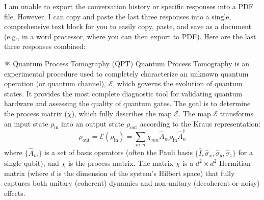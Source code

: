 I am unable to export the conversation history or specific responses into a PDF file.
However, I can copy and paste the last three responses into a single, comprehensive text block for you to easily copy, paste, and save as a document (e.g., in a word processor, where you can then export to PDF).
Here are the last three responses combined:

⚛️ Quantum Process Tomography (QPT)
Quantum Process Tomography is an experimental procedure used to completely characterize an unknown quantum operation (or quantum channel), $\mathcal{E}$, which governs the evolution of quantum states. It provides the most complete diagnostic tool for validating quantum hardware and assessing the quality of quantum gates.
The goal is to determine the process matrix ($\chi$), which fully describes the map $\mathcal{E}$. The map $\mathcal{E}$ transforms an input state $\rho_{\text{in}}$ into an output state $\rho_{\text{out}}$ according to the Kraus representation:
$$\rho_{\text{out}} = \mathcal{E}(\rho_{\text{in}}) = \sum_{m,n} \chi_{mn} \hat{A}_m \rho_{\text{in}} \hat{A}^\dagger_n$$
where $\{\hat{A}_m\}$ is a set of basis operators (often the Pauli basis $\{\hat{I}, \hat{\sigma}_x, \hat{\sigma}_y, \hat{\sigma}_z\}$ for a single qubit), and $\chi$ is the process matrix. The matrix $\chi$ is a $d^2 \times d^2$ Hermitian matrix (where $d$ is the dimension of the system's Hilbert space) that fully captures both unitary (coherent) dynamics and non-unitary (decoherent or noisy) effects.

